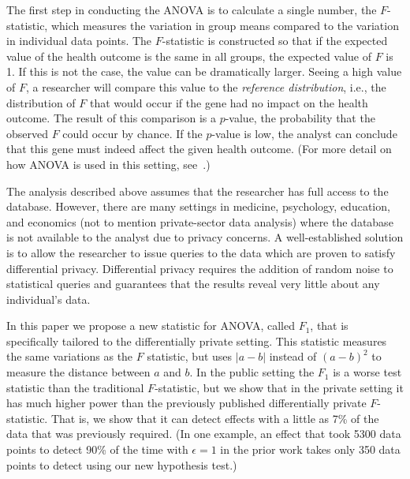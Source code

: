 \documentclass[USenglish,oneside]{article}
\let\svthefootnote\thefootnote
\newcommand\blankfootnote[1]{%
  \let\thefootnote\relax\footnotetext{#1}%
  \let\thefootnote\svthefootnote%
}
\newcounter{ag}
\newcommand{\ag}[1]{\textcolor{red}{AG-\arabic{ag}}\blankfootnote{\textcolor{red}{AG-\arabic{ag}: #1}}\addtocounter{ag}{1}}
\newcounter{ab}
\newcounter{ar}
\newcounter{igh}
\newcounter{ms}
\begin{document}
The first step in conducting the ANOVA is to calculate a single number, the $F$-statistic, which measures the variation in group means compared to the variation in individual data points. The $F$-statistic is constructed so that if the expected value of the health outcome is the same in all groups, the expected value of $F$ is 1.  If this is not the case, the value can be dramatically larger.  Seeing a high value of $F$, a researcher will compare this value to the \textit{reference distribution}, i.e., the distribution of $F$ that would occur if the gene had no impact on the health outcome.  The result of this comparison is a $p$-value, the probability that the observed $F$ could occur by chance.  If the $p$-value is low, the analyst can conclude that this gene must indeed affect the given health outcome.  (For more detail on how ANOVA is used in this setting, see~\cite{myers2003researchdesign}.)

The analysis described above assumes that the researcher has full access to the database. However, there are many settings in medicine, psychology, education, and economics (not to mention private-sector data analysis) where the database is not available to the analyst due to privacy concerns. A well-established solution is to allow the researcher to issue queries to the data which are proven to satisfy differential privacy.  Differential privacy requires the addition of random noise to statistical queries and guarantees that the results reveal very little about any individual's data.

In this paper we propose a new statistic for ANOVA, called $F_1$, that is specifically tailored to the differentially private setting. This statistic measures the same variations as the $F$ statistic, but uses $|a-b|$ instead of $(a-b)^2$ to measure the distance between $a$ and $b$.  In the public setting the $F_1$ is a worse test statistic than the traditional $F$-statistic, but we show that in the private setting it has much higher power than the previously published differentially private $F$-statistic.  That is, we show that it can detect effects with a little as 7\% of the data that was previously required.  (In one example, an effect that took 5300 data points to detect 90\% of the time with $\epsilon=1$ in the prior work takes only 350 data points to detect using our new hypothesis test.)

\end{document}
